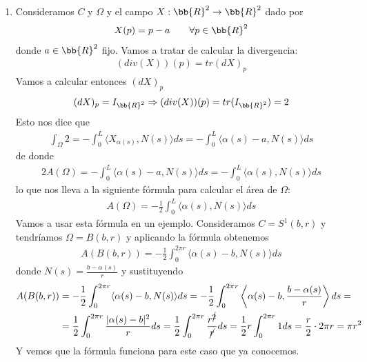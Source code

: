 \begin{observacion}
\begin{enumerate}[start=4]
        \item Consideramos $C$ y $\Omega$ y el campo $X:\bb{R}^2 \to \bb{R}^2$ dado por 
        \begin{gather*}
            X(p)=p-a \qquad \forall p \in \bb{R}^2
        \end{gather*}
        donde $a\in \bb{R}^2$ fijo. Vamos a tratar de calcular la divergencia:
        \begin{gather*}
            (div(X))(p) = tr(dX)_p
        \end{gather*}
        Vamos a calcular entonces $(dX)_p$
        \begin{gather*}
            (dX)_p = I_{\bb{R}^2} \Rightarrow (div(X))(p) = tr(I_{\bb{R}^2})=2
        \end{gather*}
        Esto nos dice que 
        \begin{gather*}
            \int_\Omega 2 = - \int_0^L \langle X_{\alpha(s)}, N(s) \rangle ds = -\int_0^L \langle \alpha(s)-a, N(s) \rangle ds
        \end{gather*}
        de donde
        \begin{gather*}
            2A(\Omega) =  -\int_0^L \langle \alpha(s)-a, N(s) \rangle ds = -\int_0^L \langle \alpha(s), N(s) \rangle ds
        \end{gather*}
        lo que nos lleva a la siguiente fórmula para calcular el área de $\Omega$:
        \begin{gather*}
            \boxed{A(\Omega) = -\frac{1}{2} \int_0^L \langle \alpha(s), N(s)\rangle ds}
        \end{gather*}
        Vamos a usar esta fórmula en un ejemplo. Consideramos $C=S^1(b, r)$ y tendríamos $\Omega = B(b,r)$ y aplicando la fórmula obtenemos
        \begin{gather*}
            A(B(b,r)) = - \frac{1}{2} \int_0^{2\pi r} \langle \alpha(s)-b, N(s)\rangle ds
        \end{gather*}
        donde $N(s) = \frac{b-\alpha(s)}{r}$ y sustituyendo
        \begin{align*}
            A(B(b,r)) &= - \frac{1}{2} \int_0^{2\pi r} \langle \alpha(s)-b, N(s)\rangle ds = - \frac{1}{2} \int_0^{2\pi r} \left\langle \alpha(s)-b, \frac{b-\alpha(s)}{r}\right\rangle ds =\\
            &= \frac{1}{2} \int_0^{2\pi r} \frac{|\alpha(s)-b|^2}{r} ds = \frac{1}{2} \int_0^{2\pi r} \frac{r^{\cancel{2}}}{\cancel{r}} ds = \frac{1}{{2}} r \int_0^{2\pi r} 1ds = \frac{r}{2}\cdot 2\pi r = \pi r^2
        \end{align*}
        Y vemos que la fórmula funciona para este caso que ya conocemos.


\end{enumerate}
\end{observacion}
